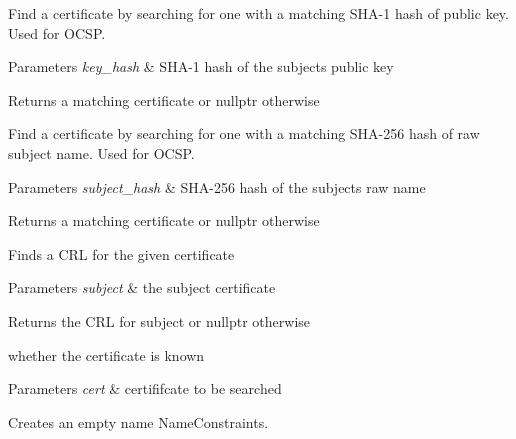 Find a certificate by searching for one with a matching S\+H\+A-\/1 hash of public key. Used for O\+C\+SP. 
\begin{DoxyParams}{Parameters}
{\em key\+\_\+hash} & S\+H\+A-\/1 hash of the subject\textquotesingle{}s public key \\
\hline
\end{DoxyParams}
\begin{DoxyReturn}{Returns}
a matching certificate or nullptr otherwise
\end{DoxyReturn}
Find a certificate by searching for one with a matching S\+H\+A-\/256 hash of raw subject name. Used for O\+C\+SP. 
\begin{DoxyParams}{Parameters}
{\em subject\+\_\+hash} & S\+H\+A-\/256 hash of the subject\textquotesingle{}s raw name \\
\hline
\end{DoxyParams}
\begin{DoxyReturn}{Returns}
a matching certificate or nullptr otherwise
\end{DoxyReturn}
Finds a C\+RL for the given certificate 
\begin{DoxyParams}{Parameters}
{\em subject} & the subject certificate \\
\hline
\end{DoxyParams}
\begin{DoxyReturn}{Returns}
the C\+RL for subject or nullptr otherwise

whether the certificate is known 
\end{DoxyReturn}

\begin{DoxyParams}{Parameters}
{\em cert} & certififcate to be searched\\
\hline
\end{DoxyParams}
Creates an empty name Name\+Constraints.

